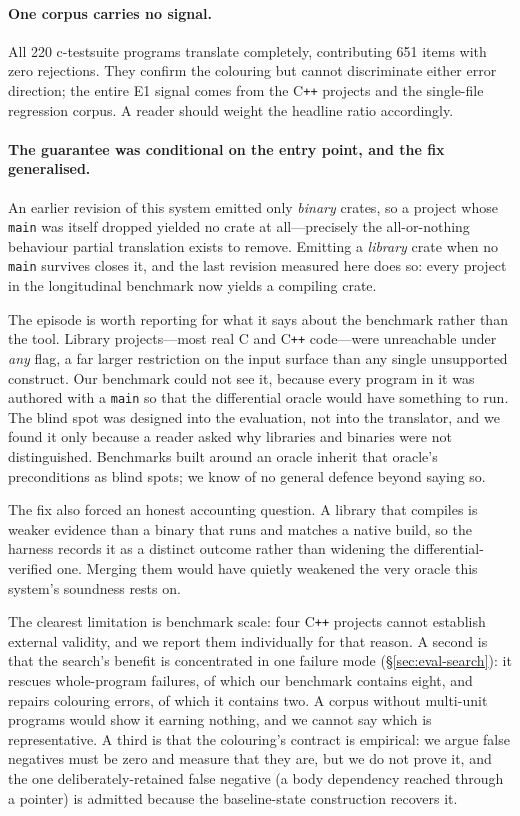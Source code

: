 \documentclass[10pt,twocolumn]{article}
\begin{document}
\paragraph{One corpus carries no signal.} All 220 c-testsuite programs
translate completely, contributing 651 items with zero rejections. They
confirm the colouring but cannot discriminate either error direction; the
entire E1 signal comes from the C\texttt{++} projects and the single-file
regression corpus. A reader should weight the headline ratio accordingly.

\paragraph{The guarantee was conditional on the entry point, and the fix
generalised.} An earlier revision of this system emitted only \emph{binary}
crates, so a project whose \texttt{main} was itself dropped yielded no crate
at all---precisely the all-or-nothing behaviour partial translation exists to
remove. Emitting a \emph{library} crate when no \texttt{main} survives closes
it, and the last revision measured here does so: every project in the
longitudinal benchmark now yields a compiling crate.

The episode is worth reporting for what it says about the benchmark rather
than the tool. Library projects---most real C and C\texttt{++} code---were
unreachable under \emph{any} flag, a far larger restriction on the input
surface than any single unsupported construct. Our benchmark could not see it,
because every program in it was authored with a \texttt{main} so that the
differential oracle would have something to run. The blind spot was designed
into the evaluation, not into the translator, and we found it only because a
reader asked why libraries and binaries were not distinguished. Benchmarks
built around an oracle inherit that oracle's preconditions as blind spots; we
know of no general defence beyond saying so.

The fix also forced an honest accounting question. A library that compiles is
weaker evidence than a binary that runs and matches a native build, so the
harness records it as a distinct outcome rather than widening the
differential-verified one. Merging them would have quietly weakened the very
oracle this system's soundness rests on.

The clearest limitation is benchmark scale: four C\texttt{++} projects cannot
establish external validity, and we report them individually for that reason.
A second is that the search's benefit is
concentrated in one failure mode (\S\ref{sec:eval-search}): it rescues
whole-program failures, of which our benchmark contains eight, and repairs
colouring errors, of which it contains two. A corpus without multi-unit
programs would show it earning nothing, and we cannot say which is
representative. A third is that the colouring's contract
is empirical: we argue false negatives must be zero and measure that they are,
but we do not prove it, and the one deliberately-retained false negative
(a body dependency reached through a pointer) is admitted because the
baseline-state construction recovers it.
\end{document}
